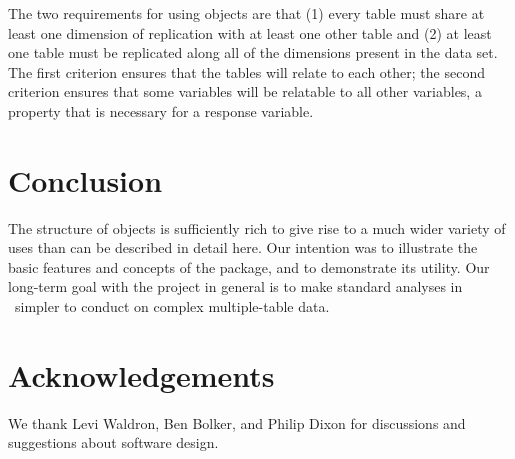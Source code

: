 \documentclass[a4paper]{report}
\numberwithin{exercise}{section}
\begin{document}
\begin{article}
The two requirements for using  objects are that (1) every table must share at least one dimension of replication with at least one other table and (2) at least one table must be replicated along all of the dimensions present in the data set.  The first criterion ensures that the tables will relate to each other; the second criterion ensures that some variables will be relatable to all other variables, a property that is necessary for a response variable.

\section{Conclusion}

The structure of  objects is sufficiently rich to give rise to a much wider variety of uses than can be described in detail here.  Our intention was to illustrate the basic features and concepts of the  package, and to demonstrate its utility.  Our long-term goal with the  project in general is to make standard analyses in \R\ simpler to conduct on complex multiple-table data.

\section*{Acknowledgements}
We thank Levi Waldron, Ben Bolker, and Philip Dixon for discussions and suggestions about software design.




\end{article}
\end{document}
